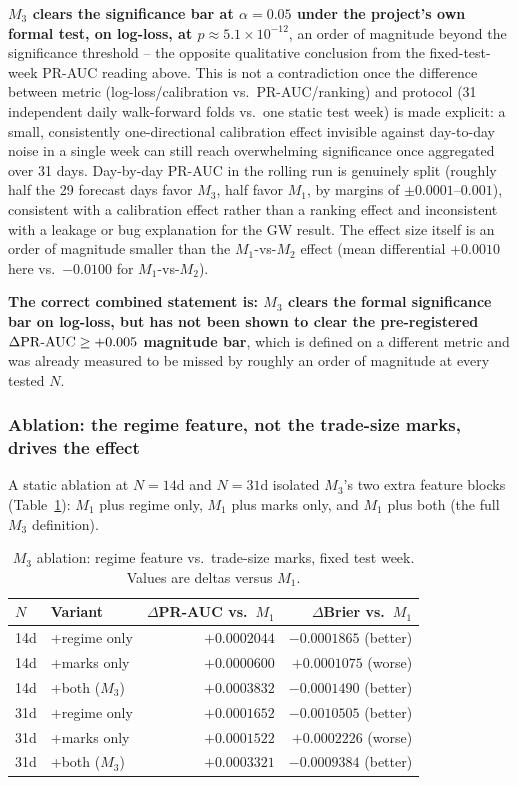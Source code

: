 \textbf{$M_3$ clears the significance bar at $\alpha=0.05$ under the
project's own formal test, on log-loss, at $p \approx 5.1 \times
10^{-12}$}, an order of magnitude beyond the significance threshold --
the opposite qualitative conclusion from the fixed-test-week PR-AUC
reading above. This is not a contradiction once the difference between
metric (log-loss/calibration vs.\ PR-AUC/ranking) and protocol
(31 independent daily walk-forward folds vs.\ one static test week) is
made explicit: a small, consistently one-directional calibration effect
invisible against day-to-day noise in a single week can still reach
overwhelming significance once aggregated over 31 days. Day-by-day
PR-AUC in the rolling run is genuinely split (roughly half the 29
forecast days favor $M_3$, half favor $M_1$, by margins of
$\pm 0.0001$--$0.001$), consistent with a calibration effect rather than a
ranking effect and inconsistent with a leakage or bug explanation for the
GW result. The effect size itself is an order of magnitude smaller than
the $M_1$-vs-$M_2$ effect (mean differential $+0.0010$ here vs.\
$-0.0100$ for $M_1$-vs-$M_2$).

\textbf{The correct combined statement is: $M_3$ clears the formal
significance bar on log-loss, but has not been shown to clear the
pre-registered $\Delta\mathrm{PR\text{-}AUC} \ge +0.005$ magnitude bar}, which is defined
on a different metric and was already measured to be missed by roughly an
order of magnitude at every tested $N$.

\subsubsection{Ablation: the regime feature, not the trade-size marks, drives the effect}
\label{sec:results-m3-ablation}

A static ablation at $N=14$d and $N=31$d isolated $M_3$'s two extra
feature blocks (Table~\ref{tab:m3-ablation}): $M_1$ plus regime only,
$M_1$ plus marks only, and $M_1$ plus both (the full $M_3$ definition).

\begin{table}[htbp]
\centering
\caption{$M_3$ ablation: regime feature vs.\ trade-size marks, fixed test
week. Values are deltas versus $M_1$.}
\label{tab:m3-ablation}
\begin{tabular}{@{}llrr@{}}
\toprule
$N$ & Variant & $\Delta$PR-AUC vs.\ $M_1$ & $\Delta$Brier vs.\ $M_1$ \\
\midrule
14d & +regime only  & $+0.0002044$ & $-0.0001865$ (better) \\
14d & +marks only   & $+0.0000600$ & $+0.0001075$ (worse) \\
14d & +both ($M_3$) & $+0.0003832$ & $-0.0001490$ (better) \\
31d & +regime only  & $+0.0001652$ & $-0.0010505$ (better) \\
31d & +marks only   & $+0.0001522$ & $+0.0002226$ (worse) \\
31d & +both ($M_3$) & $+0.0003321$ & $-0.0009384$ (better) \\
\bottomrule
\end{tabular}
\end{table}

